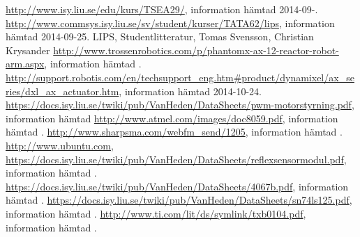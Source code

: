 
\begin{thebibliography}{9}
	\url{http://www.isy.liu.se/edu/kurs/TSEA29/}, information hämtad 2014-09-.
	\url{http://www.commsys.isy.liu.se/sv/student/kurser/TATA62/lips}, information hämtad 2014-09-25.
	LIPS, Studentlitteratur, Tomas Svensson, Christian Krysander 
	\url{http://www.trossenrobotics.com/p/phantomx-ax-12-reactor-robot-arm.aspx}, information hämtad .
	\url{http://support.robotis.com/en/techsupport_eng.htm#product/dynamixel/ax_series/dxl_ax_actuator.htm}, information hämtad 	2014-10-24.
	\url{https://docs.isy.liu.se/twiki/pub/VanHeden/DataSheets/pwm-motorstyrning.pdf}, information hämtad 
	\url{http://www.atmel.com/images/doc8059.pdf}, information hämtad .
	\url{http://www.sharpsma.com/webfm_send/1205}, information hämtad .
	\url{http://www.ubuntu.com}, 
	\url{https://docs.isy.liu.se/twiki/pub/VanHeden/DataSheets/reflexsensormodul.pdf}, information hämtad .
	\url{https://docs.isy.liu.se/twiki/pub/VanHeden/DataSheets/4067b.pdf}, information hämtad .
	\url{https://docs.isy.liu.se/twiki/pub/VanHeden/DataSheets/sn74ls125.pdf}, information hämtad .
	\url{http://www.ti.com/lit/ds/symlink/txb0104.pdf}, information hämtad .
\end{thebibliography}


{} \newline
{} \newline
{} \newline

